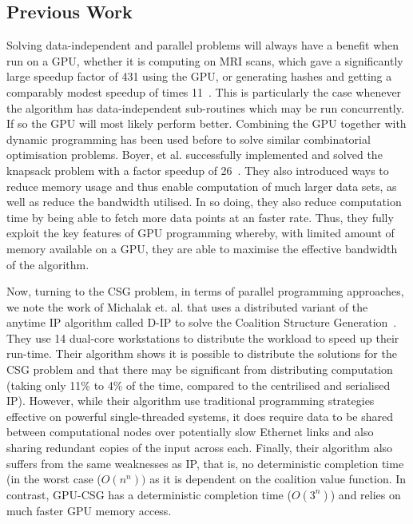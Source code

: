 \documentclass[a4paper, 12pt]{report}
\begin{document}
\subsection{Previous Work}
Solving data-independent and parallel problems will always have a benefit when run on a GPU, 
whether it is computing on MRI scans, which gave a significantly large speedup factor of 431 using the GPU, 
or generating hashes and getting a comparably modest speedup of times 11~\cite{ryoo2008optimization}.  
This is particularly the case whenever the algorithm has data-independent sub-routines which may be run concurrently. 
If so the GPU will most likely perform better. 
Combining the GPU together with dynamic programming has been used before to solve similar combinatorial optimisation problems.  
Boyer, et al. successfully implemented and solved the knapsack problem with a factor speedup of 26~\cite{boyer2012solving}.  
They also introduced ways to reduce memory usage and thus enable computation of much larger data sets, as well as reduce the  bandwidth utilised. 
In so doing, they also reduce computation time by being able to fetch more data points at an faster rate. 
Thus, they fully exploit the key features of GPU programming whereby, with limited amount of memory available on a GPU,  
they are able to maximise the effective bandwidth of the algorithm.

Now, turning to the CSG problem, in terms of parallel programming approaches, 
we note the work of Michalak et. al. that uses a distributed variant of the anytime IP algorithm called 
D-IP to solve the Coalition Structure Generation~\cite{michalak2010distributed}. 
They use 14 dual-core workstations to distribute the workload to speed up their run-time. 
Their algorithm  shows it is possible to distribute the solutions for the CSG problem and that there may be
significant from distributing computation (taking only 11\% to 4\% of the time, compared to the centrilised and serialised IP). 
However, while their algorithm use traditional programming strategies effective on powerful single-threaded systems, 
it does require data to be shared between computational nodes over potentially slow Ethernet links and also sharing 
redundant copies of the input across each. Finally, their algorithm also suffers from the same weaknesses as IP, that is, 
no deterministic completion time (in the worst case ($O(n^n))$ as it is dependent on the coalition value function. 
In contrast, GPU-CSG has a deterministic completion time ($O(3^n)$) and relies on much faster GPU memory access.
\end{document}
